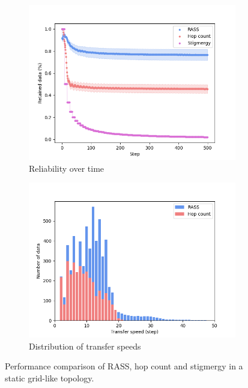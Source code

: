 \documentclass[runningheads]{llncs}
\begin{document}
\begin{figure}
    \centering
    \begin{subfigure}{0.49\textwidth}
        \includegraphics[width=\textwidth]{figures/grid_reliability.png}
        \caption{Reliability over time}
        \label{results:grid_100_reliability}
    \end{subfigure}
    \begin{subfigure}{0.49\textwidth}
        \includegraphics[width=\textwidth]{figures/grid_speed.png}
        \caption{Distribution of transfer speeds}
        \label{results:grid_100_speed}
    \end{subfigure}
    \caption{Performance comparison of RASS, hop count and stigmergy in a static grid-like topology.}
    \label{results:staticTopology}
    \vspace{-2mm}
\end{figure}
\end{document}
